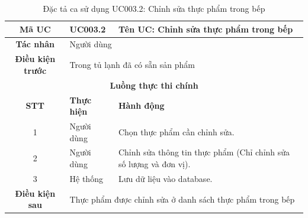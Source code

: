 \begin{table}[H]
    \centering
    \label{tab:uc003-2}
    \begin{tabularx}{\textwidth}{|c|p{3.5cm}|X|}
        \hline
        \rowcolor{headergreen} 
        \textbf{Mã UC} & \textbf{UC003.2} & \textbf{Tên UC: Chỉnh sửa thực phẩm trong bếp} \\ \hline
        \textbf{Tác nhân} & \multicolumn{2}{l|}{Người dùng} \\ \hline
        \textbf{Điều kiện trước} & \multicolumn{2}{X|}{Trong tủ lạnh đã có sẵn sản phẩm} \\ \hline
        
        \multicolumn{3}{|c|}{\cellcolor{headerorange}\textbf{Luồng thực thi chính}} \\ \hline
        \rowcolor{graybg} \textbf{STT} & \textbf{Thực hiện} & \textbf{Hành động} \\ \hline
        1 & Người dùng & Chọn thực phẩm cần chỉnh sửa. \\ \hline
        2 & Người dùng & Chỉnh sửa thông tin thực phẩm (Chỉ chỉnh sửa số lượng và đơn vị). \\ \hline
        3 & Hệ thống & Lưu dữ liệu vào database. \\ \hline
        
        \textbf{Điều kiện sau} & \multicolumn{2}{X|}{Thực phẩm được chỉnh sửa ở danh sách thực phẩm trong bếp} \\ \hline
    \end{tabularx}
    \caption{Đặc tả ca sử dụng UC003.2: Chỉnh sửa thực phẩm trong bếp}
\end{table}

